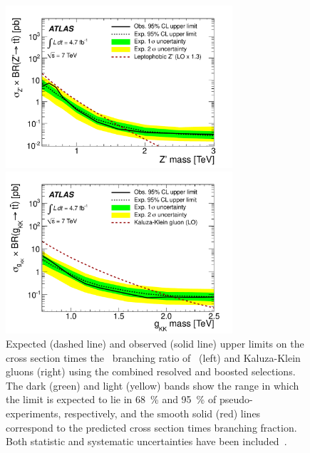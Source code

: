 \begin{figure}[htbp]
  \centering
  \includegraphics[width=0.75\textwidth]{PartTopQuark/Plots/fig_11a.pdf}

  \includegraphics[width=0.75\textwidth]{PartTopQuark/Plots/fig_11b.pdf}
  \caption[Expected (dashed line) and observed (solid line) upper limits on the cross section times the \ttbar\ branching ratio of \Zprime\ (left) and Kaluza-Klein gluons (right) using the combined resolved and boosted selections.]{Expected (dashed line) and observed (solid line) upper limits on the cross section times the \ttbar\ branching ratio of \Zprime\ (left) and Kaluza-Klein gluons (right) using the combined resolved and boosted selections. The dark (green) and light (yellow) bands show the range in which the limit is expected to lie in \SI{68}{\percent} and \SI{95}{\percent} of pseudo-experiments, respectively, and the smooth solid (red) lines correspond to the predicted cross section times branching fraction. Both statistic and systematic uncertainties have been included~\cite{Boosted:ATLASExclusion7TeV}.}\label{fig:BoostedLimits}
\end{figure}
